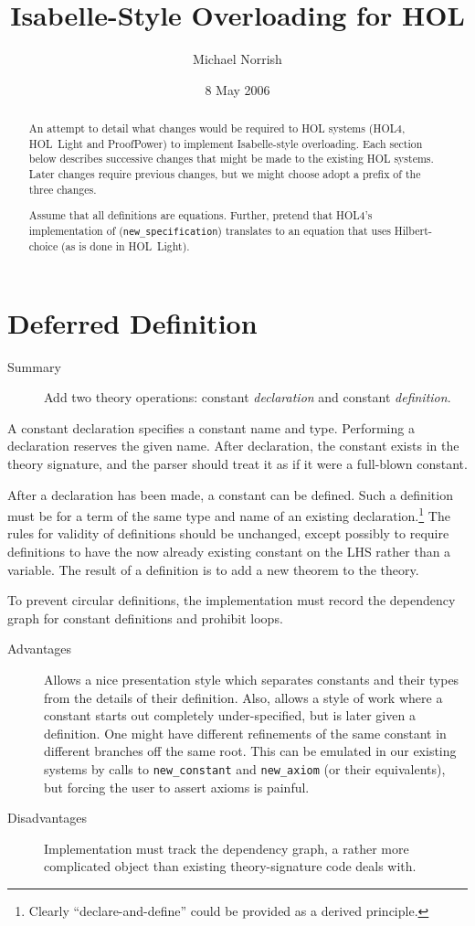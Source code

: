 \documentclass[11pt]{article}
\title{Isabelle-Style Overloading for HOL}
\author{Michael Norrish}
\date{8 May 2006}
\begin{document}
\maketitle
\begin{abstract}
  An attempt to detail what changes would be required to HOL systems
  (HOL4, HOL~Light and ProofPower) to implement Isabelle-style
  overloading.  Each section below describes successive changes that
  might be made to the existing HOL systems.  Later changes require
  previous changes, but we might choose adopt a prefix of the three
  changes.

  Assume that all definitions are equations.  Further, pretend that
  HOL4's implementation of (\texttt{new\_specification}) translates to
  an equation that uses Hilbert-choice (as is done in HOL~Light).
\end{abstract}

\section{Deferred Definition}
\label{sec:deferred-definition}

\begin{description}
\item[Summary] Add two theory operations: constant \emph{declaration}
  and constant \emph{definition}.
\end{description}

A constant declaration specifies a constant name and type.  Performing
a declaration reserves the given name.  After declaration, the
constant exists in the theory signature, and the parser should treat
it as if it were a full-blown constant.

After a declaration has been made, a constant can be defined.  Such a
definition must be for a term of the same type and name of an existing
declaration.\footnote{Clearly ``declare-and-define'' could be provided
  as a derived principle.} The rules for validity of definitions
should be unchanged, except possibly to require definitions to have
the now already existing constant on the LHS rather than a variable.
The result of a definition is to add a new theorem to the theory.

To prevent circular definitions, the implementation must record the
dependency graph for constant definitions and prohibit loops.

\begin{description}
\item[Advantages] Allows a nice presentation style which separates
  constants and their types from the details of their definition.
  Also, allows a style of work where a constant starts out completely
  under-specified, but is later given a definition.  One might have
  different refinements of the same constant in different branches off
  the same root.  This can be emulated in our existing systems by
  calls to \texttt{new\_constant} and \texttt{new\_axiom} (or their
  equivalents), but forcing the user to assert axioms is painful.
\item[Disadvantages] Implementation must track the dependency graph, a
  rather more complicated object than existing theory-signature code
  deals with.
\end{description}
\end{document}

